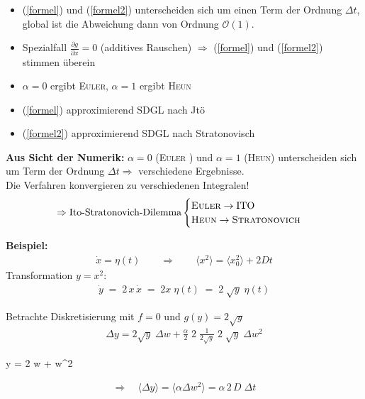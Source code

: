 \documentclass[12pt]{article}
\begin{document}
\begin{itemize}
\item (\ref{formel}) und (\ref{formel2}) unterscheiden sich um einen Term der Ordnung $\Delta t$, global ist die Abweichung dann von Ordnung $\mathcal{O}(1)$.
\item Spezialfall $\frac{\partial g}{\partial x}=0$ (additives Rauschen) $\Rightarrow$ (\ref{formel}) und (\ref{formel2}) stimmen überein
\item $\alpha =0$ ergibt \textsc{Euler}, $\alpha=1$ ergibt \textsc{Heun}
\item (\ref{formel}) approximierend SDGL nach Jtö
\item (\ref{formel2}) approximierend SDGL nach Stratonovisch
\end{itemize}
\textbf{ Aus Sicht der Numerik:} 
$\alpha = 0 $ (\textsc{Euler}
) und $\alpha = 1$ (\textsc{Heun}) unterscheiden sich um Term der Ordnung $\Delta t \Rightarrow $ verschiedene Ergebnisse. \\ 
Die Verfahren konvergieren zu verschiedenen Integralen!
\begin{align*} \Rightarrow \text{Ito-Stratonovich-Dilemma}
\begin{cases}
\textsc{Euler} \to \text{ITO} \\
\textsc{Heun} \to \textsc{Stratonovich}
\end{cases}
\end{align*}

\textbf{Beispiel:}
 \begin{align*}
\dot{x}= \eta (t) \qquad \Rightarrow \qquad  \langle x^2 \rangle = \langle x_0^2 \rangle + 2Dt
\end{align*}
Transformation $y=x^2$:
\begin{align*}
 \dot{y} \;=\; 2 \, x \,  \dot{x} \; =\; 2 x \;  \eta (t) \; = \; 2\;  \sqrt{y} \;  \eta (t)
\end{align*}

Betrachte Diskretisierung mit $f=0$ und $g(y)= 2 \sqrt{y}$ 
\begin{align}
\Delta y = 2 \sqrt{y} \; \Delta w + \frac{\alpha}{2} \; 2\;  \frac{1}{2 \sqrt{y}} \; 2\;  \sqrt{y} \; \Delta w^2 
\end{align}
\begin{tcolorbox}[ams align, title= , colback=blue!10!white, colframe=blue!30!black] 
\Delta y = 2  \; \Delta w + \alpha \;  \Delta w^2
\end{tcolorbox}
\begin{align*}
\Rightarrow \quad \langle \Delta y \rangle = \langle \alpha \Delta w^2 \rangle = \alpha \, 2 \, D \;  \Delta t
\end{align*}
\end{document}
